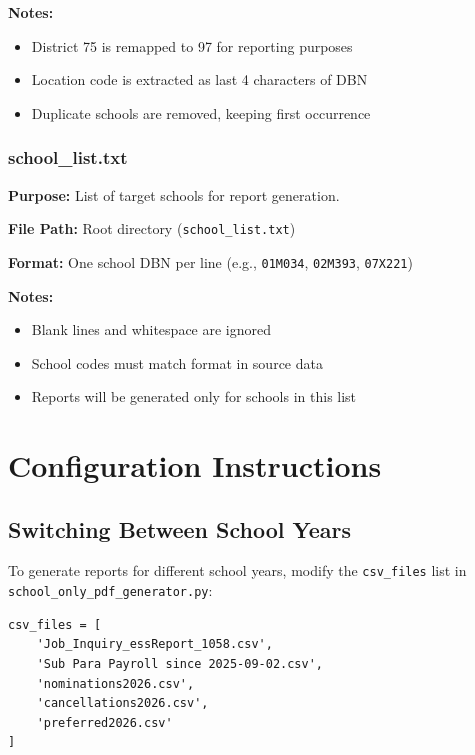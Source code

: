 \documentclass[12pt,letterpaper]{article}
\begin{document}
\textbf{Notes:}
\begin{itemize}[leftmargin=*]
    \item District 75 is remapped to 97 for reporting purposes
    \item Location code is extracted as last 4 characters of DBN
    \item Duplicate schools are removed, keeping first occurrence
\end{itemize}

\subsubsection{school\_list.txt}

\textbf{Purpose:} List of target schools for report generation.

\textbf{File Path:} Root directory (\texttt{school\_list.txt})

\textbf{Format:} One school DBN per line (e.g., \texttt{01M034}, \texttt{02M393}, \texttt{07X221})

\textbf{Notes:}
\begin{itemize}[leftmargin=*]
    \item Blank lines and whitespace are ignored
    \item School codes must match format in source data
    \item Reports will be generated only for schools in this list
\end{itemize}

\section{Configuration Instructions}

\subsection{Switching Between School Years}

To generate reports for different school years, modify the \texttt{csv\_files} list in\\
\texttt{school\_only\_pdf\_generator.py}:

\begin{tcolorbox}[colback=gray!5!white,colframe=graytext,title=\textbf{Example: SY 2025--26 (Current)},breakable]
\begin{Verbatim}[fontsize=\small]
csv_files = [
    'Job_Inquiry_essReport_1058.csv',
    'Sub Para Payroll since 2025-09-02.csv',
    'nominations2026.csv',
    'cancellations2026.csv',
    'preferred2026.csv'
]
\end{Verbatim}
\end{tcolorbox}
\end{document}
